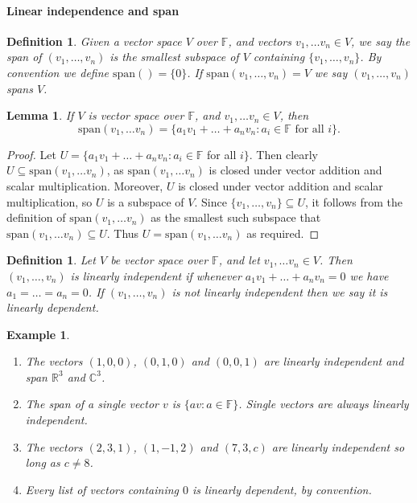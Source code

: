 \documentclass{article}
\theoremstyle{plain}
\newtheorem{definition}[theorem]{Definition}{\bfseries}{\upshape}
\newtheorem{lemma}[theorem]{Lemma}{\bfseries}{\upshape}
\newtheorem{example}[theorem]{Example}{\bfseries}{\upshape}
\newcommand{\bC}{\mathbb{C}}
\newcommand{\bR}{\mathbb{R}}
\newcommand{\bF}{\mathbb{F}}
\newcommand{\spa}{\mathrm{span}}
\begin{document}
\paragraph{Linear independence and span}

\begin{definition}
Given a vector space $V$ over $\bF$, and vectors $v_1,\ldots v_n\in V$, we say the \emph{span} of $(v_1,\ldots,v_n)$ is the smallest subspace of $V$ containing $\{v_1,\ldots,v_n\}$. By convention we define $\spa() = \{0\}$. If $\spa(v_1,\ldots,v_n) = V$ we say $(v_1,\ldots,v_n)$ \emph{spans} $V$.
\end{definition}

\begin{lemma}
If $V$ is vector space over $\bF$, and $v_1,\ldots v_n\in V$, then 
\[\spa(v_1,\ldots v_n) = \{a_1v_1+\ldots + a_nv_n: a_i \in \bF\text{ for all }i\}.\]
\end{lemma}
\begin{proof}
Let $U = \{a_1v_1+\ldots + a_nv_n: a_i \in \bF$ for all $i\}$. Then clearly $U\subseteq \spa(v_1,\ldots v_n)$, as $\spa(v_1,\ldots v_n)$ is closed under vector addition and scalar multiplication. Moreover, $U$ is closed under vector addition and scalar multiplication, so $U$ is a subspace of $V$. Since $\{v_1,\ldots,v_n\}\subseteq U$, it follows from the definition of $\spa(v_1,\ldots v_n)$ as the smallest such subspace that $\spa(v_1,\ldots v_n)\subseteq U$. Thus $U = \spa(v_1,\ldots v_n)$ as required.  
\end{proof}


\begin{definition}
Let $V$ be vector space over $\bF$, and let $v_1,\ldots v_n\in V$. Then $(v_1,\ldots,v_n)$ is \emph{linearly independent} if whenever $a_1v_1+\ldots + a_n v_n = 0$ we have $a_1=\ldots=a_n=0$. If $(v_1,\ldots,v_n)$ is not linearly independent then we say it is \emph{linearly dependent}.
\end{definition}

\begin{example}\mbox{}
\begin{enumerate}
\item The vectors $(1,0,0)$, $(0,1,0)$ and $(0,0,1)$ are linearly independent and span $\bR^3$ and $\bC^3$.
\item The span of a single vector $v$ is $\{av:a\in \bF\}$. Single vectors are always linearly independent.
\item The vectors $(2,3,1)$, $(1,-1,2)$ and $(7,3,c)$ are linearly independent so long as $c\neq 8$.
\item Every list of vectors containing $0$ is linearly dependent, by convention.
\end{enumerate}
\end{example}
\end{document}
